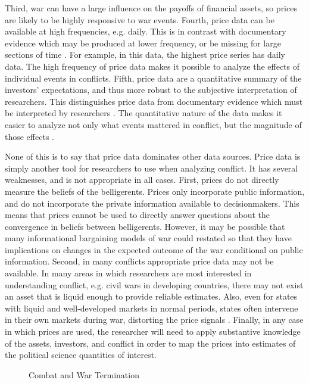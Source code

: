 Third, war can have a large influence on the payoffs of financial assets, so prices are likely to be highly responsive to war events.
Fourth, price data can be available at high frequencies, e.g. daily.
This is in contrast with documentary evidence which may be produced at lower frequency, or be missing for large sections of time \parencite[][57]{Reiter2009}. For example, in this data, the highest price series has daily data. 
The high frequency of price data makes it possible to analyze the effects of individual events in conflicts.
Fifth, price data are a quantitative summary of the investors' expectations, and thus more robust to the subjective interpretation of researchers. 
This distinguishes price data from documentary evidence which must be interpreted by researchers \parencite[][58]{Reiter2009}. 
The quantitative nature of the data makes it easier to analyze not only what events mattered in conflict, but the magnitude of those effects \parencite{north2000introd}.

None of this is to say that price data dominates other data sources.
Price data is simply another tool for researchers to use when analyzing conflict. It has several weaknesses, and is not appropriate in all cases.
First, prices do not directly measure the beliefs of the belligerents. Prices only incorporate public information, and do not incorporate the private information available to decisionmakers. 
This means that prices cannot be used to directly answer questions about the convergence in beliefs between belligerents.
However, it may be possible that many informational bargaining models of war could restated so that they have implications on changes in the expected outcome of the war conditional on public information.
Second, in many conflicts appropriate price data may not be available. 
In many areas in which researchers are most interested in understanding conflict, e.g. civil wars in developing countries, there may not exist an asset that is liquid enough to provide reliable estimates. 
Also, even for states with liquid and well-developed markets in normal periods, states often intervene in their own markets during war, distorting the price signals \parencite[12]{HaberMitchenerOosterlinckEtAl2015}. Finally, in any case in which prices are used, the researcher will need to apply substantive knowledge of the assets, investors, and conflict in order to map the prices into estimates of the political science quantities of interest.


\begin{figure}[htpb]
  \centering
  
  \caption{Combat and War Termination}
  \label{bonds_battles:fig:combat-causal-diagram}
\end{figure}



